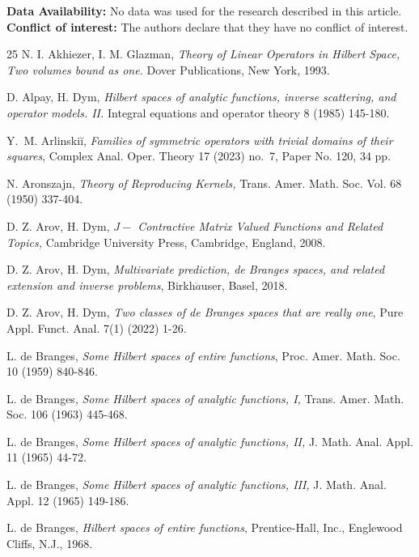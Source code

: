 \documentclass [12pt,reqno]{amsart}
\numberwithin{equation}{subsection}
\numberwithin{equation}{section}
\begin{document}
\textbf{Data Availability:} No data was used for the research described in this article.\\ 

\textbf{Conflict of interest:} The authors declare that they have no conflict of interest.

\begin{thebibliography}{25}	
 N. I. Akhiezer, I. M. Glazman,\emph{ Theory of Linear Operators in Hilbert Space, Two volumes bound as one.} Dover Publications, New York, 1993.

 D. Alpay, H. Dym, \emph{Hilbert spaces of analytic functions, inverse scattering, and operator models. II.} Integral equations and operator theory 8 (1985) 145-180.	
	
 Y.~M. Arlinski\u i, \emph{Families of symmetric operators with trivial domains of their squares}, Complex Anal. Oper. Theory 17 (2023) no.~7, Paper No. 120, 34 pp.	
	
  N. Aronszajn, \emph{Theory of Reproducing Kernels,} Trans. Amer. Math. Soc. Vol. 68 (1950) 337-404.

 D. Z. Arov, H. Dym, \emph{$J-$ Contractive Matrix Valued Functions and Related Topics,} Cambridge University Press, Cambridge, England, 2008.

 D. Z. Arov, H. Dym, \emph{Multivariate prediction, de Branges spaces, and related extension and inverse problems}, Birkh$\ddot{a}$user, Basel, 2018.

 D. Z. Arov, H.  Dym, \emph{ Two classes of de {B}ranges spaces that are really one}, Pure Appl. Funct. Anal. 7(1) (2022) 1-26.

 L. de Branges, \emph{Some Hilbert spaces of entire functions}, Proc. Amer. Math. Soc. 10 (1959) 840-846.

 L. de Branges, \emph{Some Hilbert spaces of analytic functions, I,} Trans. Amer. Math. Soc. 106 (1963) 445-468.
	
 L. de Branges, \emph{Some Hilbert spaces of analytic functions, II,} J. Math. Anal. Appl. 11 (1965) 44-72.

 L. de Branges, \emph{Some Hilbert spaces of analytic functions, III,} J. Math. Anal. Appl. 12 (1965) 149-186.

L. de Branges, \emph{ Hilbert spaces of entire functions}, Prentice-Hall, Inc., Englewood Cliffs, N.J., 1968.


\end{thebibliography}
\end{document}
